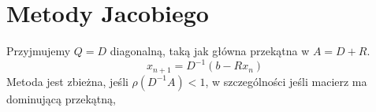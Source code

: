 \section{Metody Jacobiego}
Przyjmujemy \( Q = D\) diagonalną, taką jak główna przekątna w \( A = D+R \).
\[
    x_{n+1} = D^{-1}(b - Rx_n)
\]
Metoda jest zbieżna, jeśli \( \rho(D^{-1}A) < 1 \), w szczególności jeśli macierz ma dominującą przekątną,

